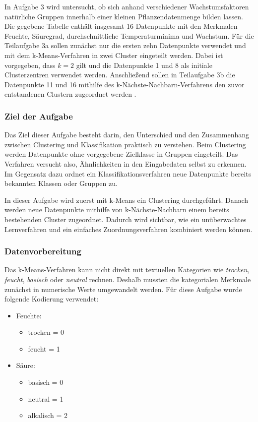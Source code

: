 \documentclass[12pt,a4paper]{article}
\begin{document}
In Aufgabe 3 wird untersucht, ob sich anhand verschiedener Wachstumsfaktoren natürliche Gruppen innerhalb einer kleinen Pflanzendatenmenge bilden lassen. Die gegebene Tabelle enthält insgesamt 16 Datenpunkte mit den Merkmalen Feuchte, Säuregrad, durchschnittliche Temperaturminima und Wachstum. Für die Teilaufgabe 3a sollen zunächst nur die ersten zehn Datenpunkte verwendet und mit dem k-Means-Verfahren in zwei Cluster eingeteilt werden. Dabei ist vorgegeben, dass $k=2$ gilt und die Datenpunkte 1 und 8 als initiale Clusterzentren verwendet werden. Anschließend sollen in Teilaufgabe 3b die Datenpunkte 11 und 16 mithilfe des k-Nächste-Nachbarn-Verfahrens den zuvor entstandenen Clustern zugeordnet werden .

\subsubsection{Ziel der Aufgabe}

Das Ziel dieser Aufgabe besteht darin, den Unterschied und den Zusammenhang zwischen Clustering und Klassifikation praktisch zu verstehen. Beim Clustering werden Datenpunkte ohne vorgegebene Zielklasse in Gruppen eingeteilt. Das Verfahren versucht also, Ähnlichkeiten in den Eingabedaten selbst zu erkennen. Im Gegensatz dazu ordnet ein Klassifikationsverfahren neue Datenpunkte bereits bekannten Klassen oder Gruppen zu.

In dieser Aufgabe wird zuerst mit k-Means ein Clustering durchgeführt. Danach werden neue Datenpunkte mithilfe von k-Nächste-Nachbarn einem bereits bestehenden Cluster zugeordnet. Dadurch wird sichtbar, wie ein unüberwachtes Lernverfahren und ein einfaches Zuordnungsverfahren kombiniert werden können.

\subsubsection{Datenvorbereitung}

Das k-Means-Verfahren kann nicht direkt mit textuellen Kategorien wie \textit{trocken}, \textit{feucht}, \textit{basisch} oder \textit{neutral} rechnen. Deshalb mussten die kategorialen Merkmale zunächst in numerische Werte umgewandelt werden. Für diese Aufgabe wurde folgende Kodierung verwendet:

\begin{itemize}
    \item Feuchte:
    \begin{itemize}
        \item trocken = 0
        \item feucht = 1
    \end{itemize}
    \item Säure:
    \begin{itemize}
        \item basisch = 0
        \item neutral = 1
        \item alkalisch = 2
    \end{itemize}
\end{itemize}
\end{document}
